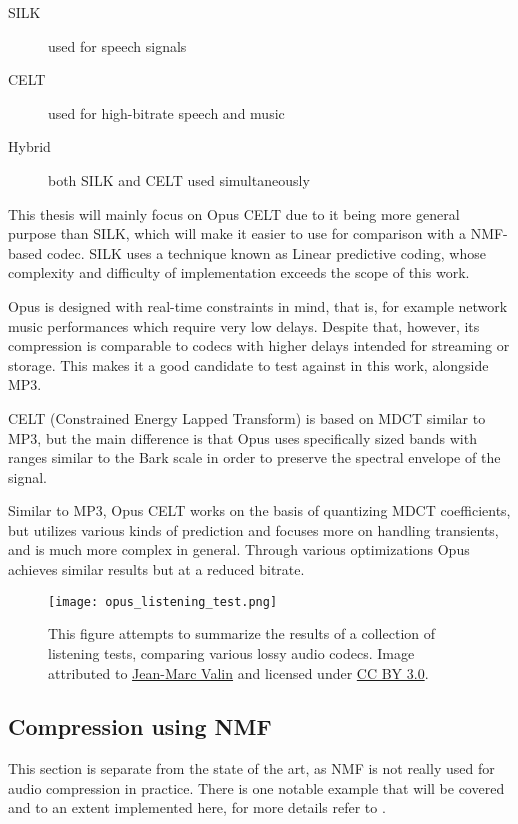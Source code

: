 \begin{description}
	\item[SILK] used for speech signals
	\item[CELT] used for high-bitrate speech and music
	\item[Hybrid] both SILK and CELT used simultaneously
\end{description}

This thesis will mainly focus on Opus CELT due to it being more general purpose than SILK, which will make it easier to use for comparison with a NMF-based codec. SILK uses a technique known as Linear predictive coding, whose complexity and difficulty of implementation exceeds the scope of this work.

Opus is designed with real-time constraints in mind, that is, for example network music performances which require very low delays. Despite that, however, its compression is comparable to codecs with higher delays intended for streaming or storage. This makes it a good candidate to test against in this work, alongside MP3.

CELT (Constrained Energy Lapped Transform) is based on MDCT similar to MP3, but the main difference is that Opus uses specifically sized bands with ranges similar to the Bark scale in order to preserve the spectral envelope of the signal.

Similar to MP3, Opus CELT works on the basis of quantizing MDCT coefficients, but utilizes various kinds of prediction and focuses more on handling transients, and is much more complex in general. Through various optimizations Opus achieves similar results but at a reduced bitrate.

\begin{figure}[ht]
	\caption[Comparison of various audio codecs]{This figure attempts to summarize the results of a collection of listening tests, comparing various lossy audio codecs. Image attributed to \href{http://opus-codec.org/comparison/}{Jean-Marc Valin} and licensed under \href{https://creativecommons.org/licenses/by/3.0/}{CC BY 3.0}.}
	\label{fig:opus_listening_test}
	\centering
	\texttt{[image: opus\_listening\_test.png]}
\end{figure}

\subsection{Compression using NMF}
This section is separate from the state of the art, as NMF is not really used for audio compression in practice. There is one notable example that will be covered and to an extent implemented here, for more details refer to \cite{nikunen_2010}.

